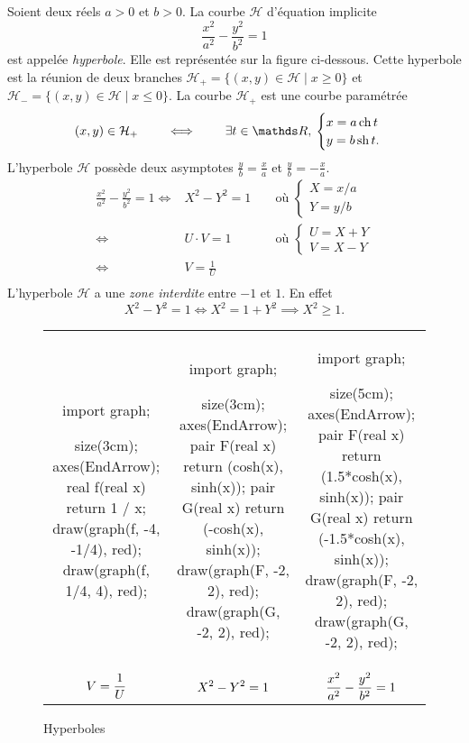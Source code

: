 \begin{exm}
	Soient deux réels $a > 0$ et $b > 0$. La courbe $\mathcal{H}$ d'équation implicite \[
		\frac{x^2}{a^2} - \frac{y^2}{b^2} = 1
	\] est appelée \textit{hyperbole}. Elle est représentée sur la figure ci-dessous.
	Cette hyperbole est la réunion de deux branches $\mathcal{H}_+ = \{(x,y) \in \mathcal{H}  \mid x \ge 0\}$ et $\mathcal{H}_- = \{(x,y) \in \mathcal{H}  \mid x \le 0\}$. La courbe $\mathcal{H}_+$ est une courbe paramétrée \[
		(x,y) \in \mathcal{H}_+ \quad\quad\iff\quad\quad \exists t \in \R,\: \begin{cases}
			x = a \ch t\\
			y = b \sh t.
		\end{cases}
	\]L'hyperbole $\mathcal{H}$ possède deux asymptotes $\frac{y}{b} =  \frac{x}{a}$ et $\frac{y}{b} = -\frac{x}{a}$.
	\begin{align*}
		\frac{x^2}{a^2} - \frac{y^2}{b^2} = 1 \iff& X^2 - Y^2 = 1 && \text{ où } \begin{cases}
			X = x / a\\
			Y = y / b
		\end{cases}\\
		\iff& U \cdot V = 1 && \text{ où } \begin{cases}
			U = X + Y\\
			V = X - Y
		\end{cases} \\
		\iff& V = \frac{1}{U} \\
	\end{align*}
	L'hyperbole $\mathcal{H}$ a une \textit{zone interdite} entre $-1$ et $1$. En effet \[
		X^2 - Y^2 = 1 \iff X^2 = 1 + Y^2 \implies X^2 \ge 1
	.\]
\end{exm}

\begin{figure}[H]
	\centering
	\begin{tabular}{ccc}
		\begin{asy}
			import graph;

			size(3cm);
			axes(EndArrow);
			real f(real x) { return 1 / x; }
			draw(graph(f, -4, -1/4), red);
			draw(graph(f,  1/4,  4), red);
		\end{asy}
		&
		\begin{asy}
			import graph;

			size(3cm);
			axes(EndArrow);
			pair F(real x) { return (cosh(x), sinh(x)); }
			pair G(real x) { return (-cosh(x), sinh(x)); }
			draw(graph(F, -2, 2), red);
			draw(graph(G, -2, 2), red);
		\end{asy}
		&
		\begin{asy}
			import graph;

			size(5cm);
			axes(EndArrow);
			pair F(real x) { return (1.5*cosh(x), sinh(x)); }
			pair G(real x) { return (-1.5*cosh(x), sinh(x)); }
			draw(graph(F, -2, 2), red);
			draw(graph(G, -2, 2), red);
		\end{asy}
		\\
		$\displaystyle V = \frac{1}{U}$ & $\displaystyle X^2 - Y^2 = 1$ & $\displaystyle\frac{x^2}{a^2}- \frac{y^2}{b^2} = 1$
	\end{tabular}
	\caption{Hyperboles}
\end{figure}


